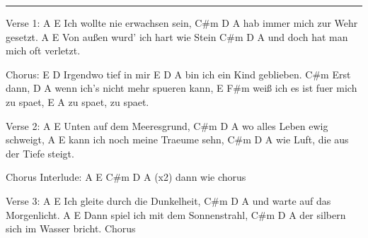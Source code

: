 \noindent\rule{\columnwidth}{1pt}

\begin{lstsong}
Verse 1:
    A                     E
Ich wollte nie erwachsen sein,
    C#m            D      A
hab immer mich zur Wehr gesetzt.
    A                         E
Von außen wurd' ich hart wie Stein
    C#m               D      A
und doch hat man mich oft verletzt.

Chorus:
E                 D
Irgendwo tief in mir
E                D    A
bin ich ein Kind geblieben.
     C#m
Erst dann,
           D                  A
wenn ich's nicht mehr spueren kann,
         E                   F#m
weiß ich es ist fuer mich zu spaet,
     E        A
zu spaet, zu spaet.

Verse 2:
     A               E
Unten auf dem Meeresgrund,
    C#m          D      A
wo alles Leben ewig schweigt,
     A                      E
kann ich noch meine Traeume sehn,
     C#m               D      A
wie Luft, die aus der Tiefe steigt.

Chorus
Interlude:
A    E    C#m    D    A    (x2)
dann wie chorus

Verse 3:
   A                       E
Ich gleite durch die Dunkelheit,
    C#m            D       A
und warte auf das Morgenlicht.
      A                        E
Dann spiel ich mit dem Sonnenstrahl,
     C#m              D       A
der silbern sich im Wasser bricht.
Chorus
\end{lstsong}
\newpage




